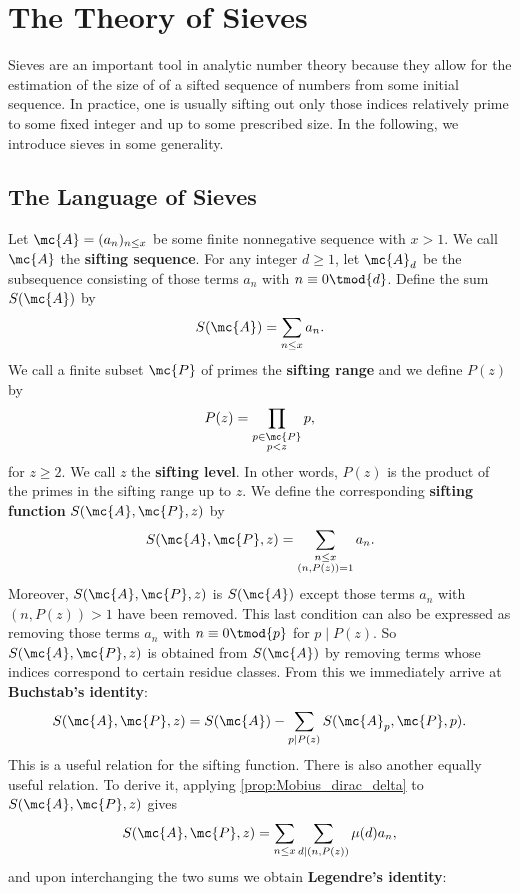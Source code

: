 \chapter{The Theory of Sieves}
  Sieves are an important tool in analytic number theory because they allow for the estimation of the size of of a sifted sequence of numbers from some initial sequence. In practice, one is usually sifting out only those indices relatively prime to some fixed integer and up to some prescribed size. In the following, we introduce sieves in some generality.
  \section{The Language of Sieves}
    Let $\mc{A} = (a_{n})_{n \le x}$ be some finite nonnegative sequence with $x > 1$. We call $\mc{A}$ the \textbf{sifting sequence}. For any integer $d \ge 1$, let $\mc{A}_{d}$ be the subsequence consisting of those terms $a_{n}$ with $n \equiv 0 \tmod{d}$. Define the sum $S(\mc{A})$ by
    \[
      S(\mc{A}) = \sum_{\substack{n \le x}}a_{n}.
    \]
    We call a finite subset $\mc{P}$ of primes the \textbf{sifting range} and we define $P(z)$ by
    \[
      P(z) = \prod_{\substack{p \in \mc{P} \\ p < z}}p,
    \]
    for $z \ge 2$. We call $z$ the \textbf{sifting level}. In other words, $P(z)$ is the product of the primes in the sifting range up to $z$. We define the corresponding \textbf{sifting function} $S(\mc{A},\mc{P},z)$ by
    \[
      S(\mc{A},\mc{P},z) = \sum_{\substack{n \le x \\ (n,P(z)) = 1}}a_{n}.
    \]
    Moreover, $S(\mc{A},\mc{P},z)$ is $S(\mc{A})$ except those terms $a_{n}$ with $(n,P(z)) > 1$ have been removed. This last condition can also be expressed as removing those terms $a_{n}$ with $n \equiv 0 \tmod{p}$ for $p \mid P(z)$. So $S(\mc{A},\mc{P},z)$ is obtained from $S(\mc{A})$ by removing terms whose indices correspond to certain residue classes. From this we immediately arrive at \textbf{Buchstab's identity}:
    \[
      S(\mc{A},\mc{P},z) = S(\mc{A})-\sum_{p \mid P(z)}S(\mc{A}_{p},\mc{P},p).
    \]
    This is a useful relation for the sifting function. There is also another equally useful relation. To derive it, applying \cref{prop:Mobius_dirac_delta} to $S(\mc{A},\mc{P},z)$ gives
    \[
      S(\mc{A},\mc{P},z) = \sum_{n \le x}\sum_{d \mid (n,P(z))}\mu(d)a_{n},
    \]
    and upon interchanging the two sums we obtain \textbf{Legendre's identity}:
